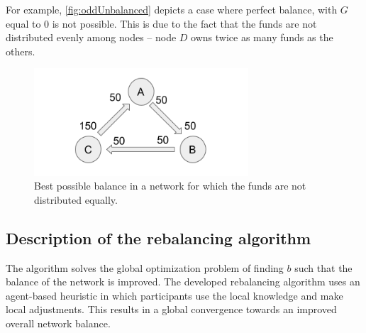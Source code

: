 \documentclass[a4paper]{paper}
\begin{document}
For example, \cref{fig:oddUnbalanced} depicts a case where perfect balance, with $G$ equal to $0$  is not possible. 
This is due to the fact that the funds are not distributed evenly among nodes -- node $D$ owns twice as many funds as the others.

\begin{figure}
 \centering
 \includegraphics[width=8cm]{img/oddBalanced.png}
 \caption{Best possible balance in a network for which the funds are not distributed equally.}
 \label{fig:oddBalanced}
\end{figure}



\subsection{Description of the rebalancing algorithm}
\label{sec:Algorithm}

The algorithm solves the global optimization problem of finding $b$ such that the balance of the network is improved.
The developed rebalancing algorithm uses an agent-based heuristic in which participants use the local knowledge and make local adjustments. 
This results in a global convergence towards an improved overall network balance. 
\end{document}
